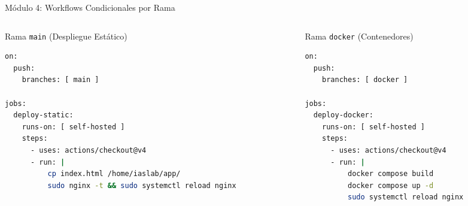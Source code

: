 \documentclass[aspectratio=169,10pt]{beamer}
\begin{document}
\begin{frame}[fragile]{Módulo 4: Workflows Condicionales por Rama}
  \begin{columns}
    \begin{column}{0.5\textwidth}
      \begin{block}{Rama \texttt{main} (Despliegue Estático)}
        \begin{lstlisting}[language=bash]
on:
  push:
    branches: [ main ]

jobs:
  deploy-static:
    runs-on: [ self-hosted ]
    steps:
      - uses: actions/checkout@v4
      - run: |
          cp index.html /home/iaslab/app/
          sudo nginx -t && sudo systemctl reload nginx
        \end{lstlisting}
      \end{block}
    \end{column}
    \begin{column}{0.5\textwidth}
      \begin{block}{Rama \texttt{docker} (Contenedores)}
        \begin{lstlisting}[language=bash]
on:
  push:
    branches: [ docker ]

jobs:
  deploy-docker:
    runs-on: [ self-hosted ]
    steps:
      - uses: actions/checkout@v4
      - run: |
          docker compose build
          docker compose up -d
          sudo systemctl reload nginx
        \end{lstlisting}
      \end{block}
    \end{column}
  \end{columns}
\end{frame}
\end{document}
